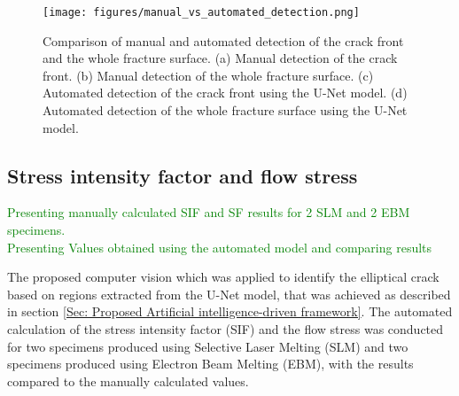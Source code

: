 \documentclass[preprint,12pt]{elsarticle}
\begin{document}
\begin{figure}[ht!]
\centering
\texttt{[image: figures/manual\_vs\_automated\_detection.png]}
\caption{Comparison of manual and automated detection of the crack front and the whole fracture surface. (a) Manual detection of the crack front. (b) Manual detection of the whole fracture surface. (c) Automated detection of the crack front using the U-Net model. (d) Automated detection of the whole fracture surface using the U-Net model.}
\label{fig:manual_vs_automated_detection}
\end{figure}

\subsection{Stress intensity factor and flow stress}
\label{Subsec: Stress intensity factor and flow stress}
\textcolor{green}{Presenting manually calculated SIF and SF results for 2 SLM and 2 EBM specimens.\\Presenting Values obtained using the automated model and comparing results }

The proposed computer vision which was applied to identify the elliptical crack based on regions extracted from the U-Net model, that was achieved as described in section \ref{Sec: Proposed Artificial intelligence-driven framework}.
The automated calculation of the stress intensity factor (SIF) and the flow stress was conducted for two specimens produced using Selective Laser Melting (SLM) and two specimens produced using Electron Beam Melting (EBM),
with the results compared to the manually calculated values.
\end{document}

